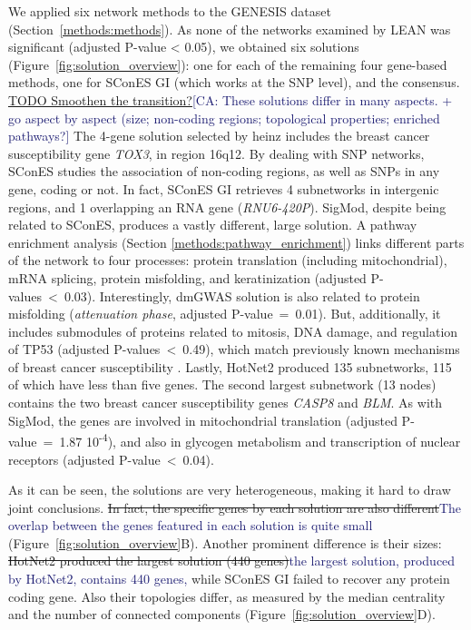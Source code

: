\documentclass[twocolumn, 11pt]{article}
\newcommand{\cazcom}[2]{{\uline{#1}}\unskip\space\textcolor{MidnightBlue}{[CA: #2]}}
\newcommand{\caz}[2]{{\sout{#1}}\unskip\space\textcolor{MidnightBlue}{#2}}
\begin{document}
We applied six network methods to the GENESIS dataset (Section~\ref{methods:methods}). As none of the networks examined by LEAN was significant (adjusted P-value < 0.05), we obtained six solutions (Figure~\ref{fig:solution_overview}): one for each of the remaining four gene-based methods, one for SConES GI (which works at the SNP level), and the consensus. \cazcom{TODO Smoothen the transition?}{These solutions differ in many aspects. + go aspect by aspect (size; non-coding regions; topological properties; enriched pathways?} The 4-gene solution selected by heinz includes the breast cancer susceptibility gene \emph{TOX3}, in region 16q12. By dealing with SNP networks, SConES studies the association of non-coding regions, as well as SNPs in any gene, coding or not. In fact, SConES GI retrieves 4 subnetworks in intergenic regions, and 1 overlapping an RNA gene (\emph{RNU6-420P}). SigMod, despite being related to SConES, produces a vastly different, large solution. A pathway enrichment analysis (Section \ref{methods:pathway_enrichment}) links different parts of the network to four processes: protein translation (including mitochondrial), mRNA splicing, protein misfolding, and keratinization (adjusted P-values~<~0.03). Interestingly, dmGWAS solution is also related to protein misfolding (\emph{attenuation phase}, adjusted P-value~=~0.01). But, additionally, it includes submodules of proteins related to mitosis, DNA damage, and regulation of TP53 (adjusted P-values~<~0.49), which match previously known mechanisms of breast cancer susceptibility \cite{nielsen_hereditary_2016}. Lastly, HotNet2 produced 135 subnetworks, 115 of which have less than five genes. The second largest subnetwork (13 nodes) contains the two breast cancer susceptibility genes \emph{CASP8} and \emph{BLM}. As with SigMod, the genes are involved in mitochondrial translation (adjusted P-value~=~1.87 \texttimes{} 10\textsuperscript{-4}), and also in glycogen metabolism and transcription of nuclear receptors (adjusted P-value~<~0.04).

As it can be seen, the solutions are very heterogeneous, making it hard to draw joint conclusions. \caz{In fact, the specific genes by each solution are also different}{The overlap between the genes featured in each solution is quite small} (Figure~\ref{fig:solution_overview}B). Another prominent difference is their sizes: \caz{HotNet2 produced the largest solution (440 genes)}{the largest solution, produced by HotNet2, contains 440 genes,} while SConES GI failed to recover any protein coding gene. Also their topologies differ, as measured by the median centrality and the number of connected components (Figure~\ref{fig:solution_overview}D). 
\end{document}
